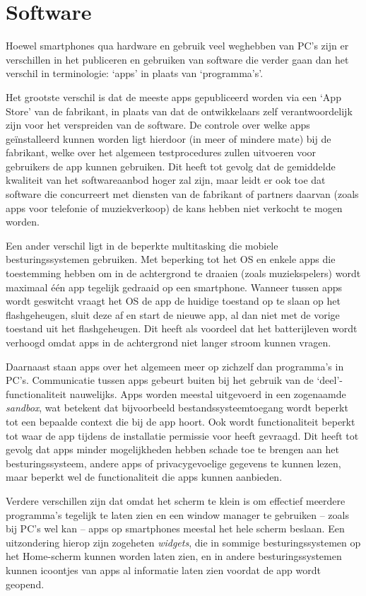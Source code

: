 \section{Software}

Hoewel smartphones qua hardware en gebruik veel weghebben van PC's zijn er verschillen in het publiceren en gebruiken van software die verder gaan dan het verschil in terminologie: `apps' in plaats van `programma's'.

Het grootste verschil is dat de meeste apps gepubliceerd worden via een `App Store' van de fabrikant, in plaats van dat de ontwikkelaars zelf verantwoordelijk zijn voor het verspreiden van de software.
De controle over welke apps ge\"installeerd kunnen worden ligt hierdoor (in meer of mindere mate) bij de fabrikant, welke over het algemeen testprocedures zullen uitvoeren voor gebruikers de app kunnen gebruiken.
Dit heeft tot gevolg dat de gemiddelde kwaliteit van het softwareaanbod hoger zal zijn, maar leidt er ook toe dat software die concurreert met diensten van de fabrikant of partners daarvan (zoals apps voor telefonie of muziekverkoop) de kans hebben niet verkocht te mogen worden.

Een ander verschil ligt in de beperkte multitasking die mobiele besturingssystemen gebruiken.
Met beperking tot het OS en enkele apps die toestemming hebben om in de achtergrond te draaien (zoals muziekspelers) wordt maximaal \'e\'en app tegelijk gedraaid op een smartphone.
Wanneer tussen apps wordt geswitcht vraagt het OS de app de huidige toestand op te slaan op het flashgeheugen, sluit deze af en start de nieuwe app, al dan niet met de vorige toestand uit het flashgeheugen.
Dit heeft als voordeel dat het batterijleven wordt verhoogd omdat apps in de achtergrond niet langer stroom kunnen vragen. \citep{extremetechmulti}

Daarnaast staan apps over het algemeen meer op zichzelf dan programma's in PC's.
Communicatie tussen apps gebeurt buiten bij het gebruik van de `deel'-functionaliteit nauwelijks.
Apps worden meestal uitgevoerd in een zogenaamde \emph{sandbox}, wat betekent dat bijvoorbeeld bestandssysteemtoegang wordt beperkt tot een bepaalde context die bij de app hoort.
Ook wordt functionaliteit beperkt tot waar de app tijdens de installatie permissie voor heeft gevraagd.
Dit heeft tot gevolg dat apps minder mogelijkheden hebben schade toe te brengen aan het besturingssysteem, andere apps of privacygevoelige gegevens te kunnen lezen, maar beperkt wel de functionaliteit die apps kunnen aanbieden.

Verdere verschillen zijn dat omdat het scherm te klein is om effectief meerdere programma's tegelijk te laten zien en een window manager te gebruiken -- zoals bij PC's wel kan -- apps op smartphones meestal het hele scherm beslaan. Een uitzondering hierop zijn zogeheten \emph{widgets}, die in sommige besturingssystemen op het Home-scherm kunnen worden laten zien, en in andere besturingssystemen kunnen icoontjes van apps al informatie laten zien voordat de app wordt geopend.
